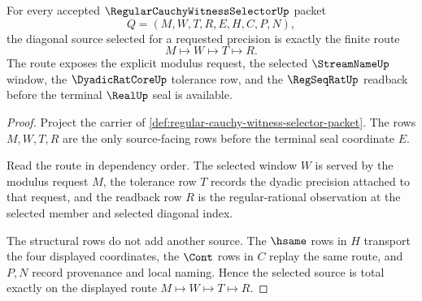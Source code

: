 \begin{theorem}
\label{thm:regular-cauchy-witness-selector-source-totality}
For every accepted $\RegularCauchyWitnessSelectorUp$ packet
$$
Q=(M,W,T,R,E,H,C,P,N),
$$
the diagonal source selected for a requested precision is exactly the finite route
$$
M \longmapsto W \longmapsto T \longmapsto R.
$$
The route exposes the explicit modulus request, the selected $\StreamNameUp$ window, the $\DyadicRatCoreUp$ tolerance row, and the $\RegSeqRatUp$ readback before the terminal $\RealUp$ seal is available.
\end{theorem}
\begin{proof}
Project the carrier of \autoref{def:regular-cauchy-witness-selector-packet}. The rows $M,W,T,R$ are the only source-facing rows before the terminal seal coordinate $E$.

Read the route in dependency order. The selected window $W$ is served by the modulus request $M$, the tolerance row $T$ records the dyadic precision attached to that request, and the readback row $R$ is the regular-rational observation at the selected member and selected diagonal index.

The structural rows do not add another source. The $\hsame$ rows in $H$ transport the four displayed coordinates, the $\Cont$ rows in $C$ replay the same route, and $P,N$ record provenance and local naming. Hence the selected source is total exactly on the displayed route $M \mapsto W \mapsto T \mapsto R$.
\end{proof}

